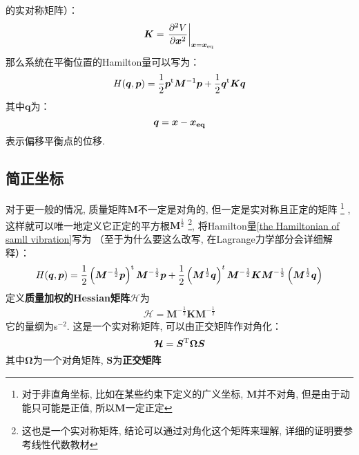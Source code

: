     的实对称矩阵）：
    \begin{equation}
        \bm{K} = \left.\frac{\partial{^2V}}{\partial{\bm{x}^2}}\right|_{\bm{x} = \bm{x}_{\mathrm{eq}}}
        \label{potential matrix}
    \end{equation}
    那么系统在平衡位置的Hamilton量可以写为：
    \begin{equation}
        H(\bm{q}, \bm{p}) = \frac{1}{2}\bm{p}^{\mathrm{t}}\bm{M}^{-1}\bm{p} + \frac{1}{2}\bm{q}^{\mathrm{t}}\bm{K}\bm{q}
        \label{the Hamiltonian of samll vibration}
    \end{equation}
    其中$\bm{q}$为：
    \begin{equation}
        \bm{q} = \bm{x} - \bm{x_{\mathrm{eq}}}
    \end{equation}
    表示偏移平衡点的位移.

    \subsection{简正坐标}
    对于更一般的情况, 质量矩阵$\bm{M}$不一定是对角的, 但一定是实对称且正定的矩阵
    \footnote{对于非直角坐标, 比如在某些约束下定义的广义坐标, $\bm{M}$并不对角, 
    但是由于动能只可能是正值, 所以$\bm{M}$一定正定}
    , 这样就可以唯一地定义它正定的平方根$\bm{M}^{\frac{1}{2}}$
    \footnote{这也是一个实对称矩阵, 结论可以通过对角化这个矩阵来理解, 
    详细的证明要参考线性代数教材}, 
    将Hamilton量\ref{the Hamiltonian of samll vibration}写为
    （至于为什么要这么改写, 在Lagrange力学部分会详细解释）：
    \begin{equation}
        H(\bm{q},\bm{p}) = \frac{1}{2}\left(\bm{M}^{-\frac{1}{2}}\bm{p}\right)^{\mathrm{t}}\bm{M}^{-\frac{1}{2}}\bm{p} + 
        \frac{1}{2}\left(\bm{M}^{\frac{1}{2}}\bm{q}\right)^{t}\bm{M}^{-\frac{1}{2}}\bm{K}\bm{M}^{-\frac{1}{2}}\left(\bm{M}^{\frac{1}{2}}\bm{q}\right)
    \end{equation}
    定义\textbf{质量加权的Hessian矩阵}$\bm{\mathcal{H}}$为 
    \begin{equation}
        \begin{split}
            \bm{\mathcal{H}} = \bm{M}^{-\frac{1}{2}}\bm{K}\bm{M}^{-\frac{1}{2}}
        \end{split}
        \label{Hessian matrix}
    \end{equation}
    它的量纲为s$^{-2}$. 这是一个实对称矩阵, 可以由正交矩阵作对角化：
    \begin{equation}
        \bm{\mathcal{H}} = \bm{S}^{\mathrm{T}}\bm{\Omega}\bm{S}
    \end{equation}
    其中$\bm{\Omega}$为一个对角矩阵, $\bm{S}$为\textbf{正交矩阵}
